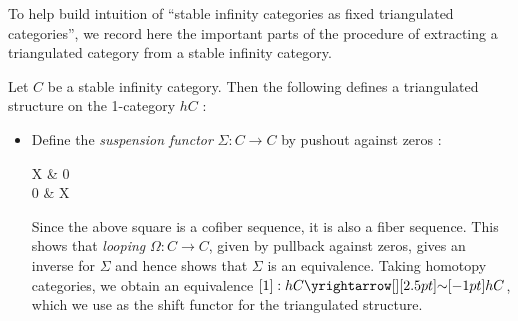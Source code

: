 \documentclass[./main.tex]{subfiles}
\begin{document}
To help build intuition of ``stable infinity categories as 
fixed triangulated categories'',
we record here the important parts of the procedure
of extracting a triangulated category from a stable infinity category.
\begin{prop}
  
  Let $C$ be a stable infinity category.
  Then the following defines a triangulated structure on 
  the 1-category $hC$ : 
  \begin{itemize}
    \item Define the \emph{suspension functor} $\Sigma : C \to C$ by
    pushout against zeros : 
    \begin{cd}
      X & 0 \\
      0 & \Sigma X
      \arrow[from=1-1,to=1-2]
      \arrow[from=1-1,to=2-1]
      \arrow[from=1-2,to=2-2]
      \arrow[from=2-1,to=2-2] 
    \end{cd}
    Since the above square is a cofiber sequence,
    it is also a fiber sequence. 
    This shows that \emph{looping} $\Omega : C \to C$,
    given by pullback against zeros, gives an inverse for $\Sigma$
    and hence shows that $\Sigma$ is an equivalence.
    Taking homotopy categories, we obtain an equivalence 
    $[1] : hC \map{\sim}{} hC$, which we use as the shift functor
    for the triangulated structure.


\end{itemize}
\end{prop}
\end{document}
